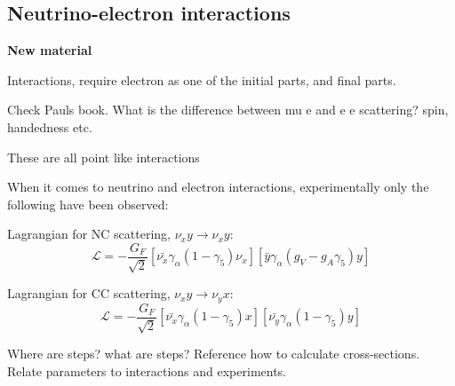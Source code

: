 \subsection{Neutrino-electron interactions}

\textbf{New material}

Interactions, require electron as one of the initial parts, and final parts.

Check Pauls book. What is the difference between mu e and e e scattering? spin, handedness etc.

These are all point like interactions

When it comes to neutrino and electron interactions, experimentally only the following have been observed:

Lagrangian for NC scattering, $\nu_x y \rightarrow \nu_x y$:
\begin{equation}
\mathcal{L}=-\frac{G_F}{\sqrt{2}} \left[ \bar{\nu_x}\gamma_\alpha (1-\gamma_5)\nu_x \right] \left[ \bar{y} \gamma_\alpha (g_V-g_A \gamma_5)y \right]
\end{equation}

Lagrangian for CC scattering, $\nu_x y \rightarrow \nu_y x$:
\begin{equation}
\mathcal{L}=-\frac{G_F}{\sqrt{2}} \left[ \bar{\nu_x}\gamma_\alpha (1-\gamma_5)x\right] \left[ \bar{\nu_y}\gamma_\alpha (1-\gamma_5)y \right]
\end{equation}

Where are steps? what are steps? Reference how to calculate cross-sections. Relate parameters to interactions and experiments.

